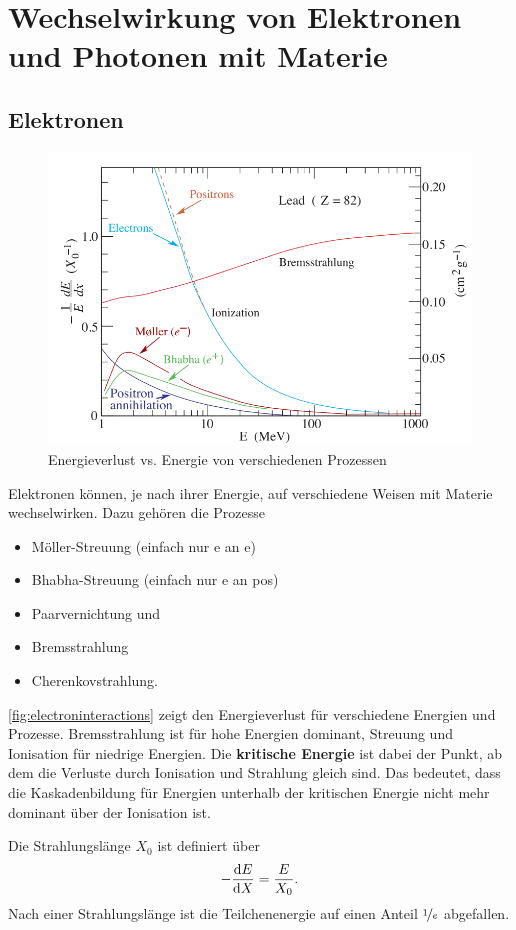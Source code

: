 \chapter{Wechselwirkung von Elektronen und Photonen mit Materie}
\section{Elektronen}
\begin{figure}
	\centering
	\includegraphics[width=.7\textwidth]{./img/electroninteractions.jpg}
	\caption{Energieverlust vs. Energie von verschiedenen Prozessen}
	\label{fig:electroninteractions}
\end{figure}
Elektronen können, je nach ihrer Energie, auf verschiedene Weisen mit Materie wechselwirken.
Dazu gehören die Prozesse
\begin{itemize}
	\item Möller-Streuung (einfach nur e an e)
	\item Bhabha-Streuung (einfach nur e an pos)
	\item Paarvernichtung und
	\item Bremsstrahlung
	\item Cherenkovstrahlung.
\end{itemize}
\autoref{fig:electroninteractions} zeigt den Energieverlust für verschiedene Energien und Prozesse.
Bremsstrahlung ist für hohe Energien dominant, Streuung und Ionisation für niedrige Energien.
Die \textbf{kritische Energie} ist dabei der Punkt, ab dem die Verluste durch Ionisation und Strahlung gleich sind.
Das bedeutet, dass die Kaskadenbildung für Energien unterhalb der kritischen Energie nicht mehr dominant über der Ionisation ist.

Die Strahlungslänge $X_0$ ist definiert über
\begin{equation*}
	-\diff[E]{X} = \frac{E}{X_0}.
\end{equation*}
Nach einer Strahlungslänge ist die Teilchenenergie auf einen Anteil $\nicefrac{1}{e}$ abgefallen.

